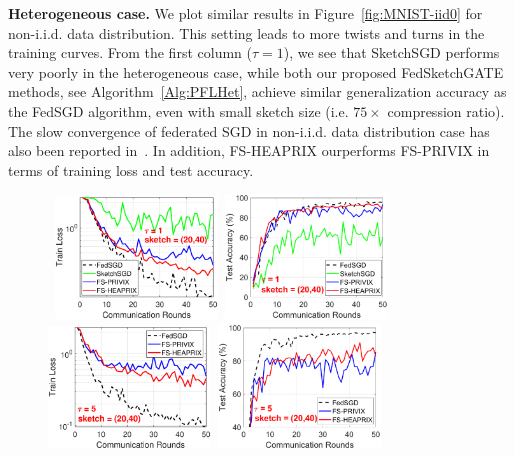 \documentclass[twoside]{article}
\begin{document}
\textbf{Heterogeneous case.} We plot similar results in Figure~\ref{fig:MNIST-iid0} for non-i.i.d. data distribution. 
This setting leads to more twists and turns in the training curves. 
From the first column ($\tau=1$), we see that SketchSGD performs very poorly in the heterogeneous case, while both our proposed FedSketchGATE methods, see Algorithm~\ref{Alg:PFLHet}, achieve similar generalization accuracy as the FedSGD algorithm, even with small sketch size (i.e. $75\times$ compression ratio). 
The slow convergence of federated SGD in non-i.i.d. data distribution case has also been reported in~\cite{mcmahan2016communication,chen2020toward}. 
In addition, FS-HEAPRIX ourperforms FS-PRIVIX in terms of training loss and test accuracy.
\begin{figure}[t]
	\begin{center}
		\mbox{			   
		\includegraphics[width=1.7in]{MNIST_figures/local1_sketch20_iid0_train_loss.eps} \hspace{-0.2in}
		\includegraphics[width=1.7in]{MNIST_figures/local1_sketch20_iid0_test_acc.eps} \hspace{-0.2in}
		}
		\mbox{
		\includegraphics[width=1.7in]{MNIST_figures/local5_sketch20_iid0_train_loss.eps} \hspace{-0.2in}
		\includegraphics[width=1.7in]{MNIST_figures/local5_sketch20_iid0_test_acc.eps}\hspace{-0.2in}
}
\end{center}
\end{figure}
\end{document}

